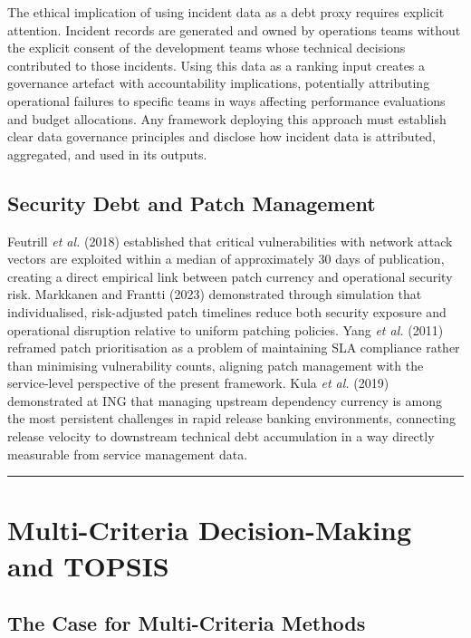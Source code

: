 \documentclass[
  british,
  12pt,
  a4paper,
]{report}
\begin{document}
The ethical implication of using incident data as a debt proxy requires
explicit attention. Incident records are generated and owned by
operations teams without the explicit consent of the development teams
whose technical decisions contributed to those incidents. Using this
data as a ranking input creates a governance artefact with
accountability implications, potentially attributing operational
failures to specific teams in ways affecting performance evaluations and
budget allocations. Any framework deploying this approach must establish
clear data governance principles and disclose how incident data is
attributed, aggregated, and used in its outputs.

\subsection{Security Debt and Patch
Management}\label{security-debt-and-patch-management}

Feutrill \emph{et al.} (2018) established that critical vulnerabilities
with network attack vectors are exploited within a median of
approximately 30 days of publication, creating a direct empirical link
between patch currency and operational security risk. Markkanen and
Frantti (2023) demonstrated through simulation that individualised,
risk-adjusted patch timelines reduce both security exposure and
operational disruption relative to uniform patching policies. Yang
\emph{et al.} (2011) reframed patch prioritisation as a problem of
maintaining SLA compliance rather than minimising vulnerability counts,
aligning patch management with the service-level perspective of the
present framework. Kula \emph{et al.} (2019) demonstrated at ING that
managing upstream dependency currency is among the most persistent
challenges in rapid release banking environments, connecting release
velocity to downstream technical debt accumulation in a way directly
measurable from service management data.

\begin{center}\rule{0.5\linewidth}{0.5pt}\end{center}

\section{Multi-Criteria Decision-Making and
TOPSIS}\label{multi-criteria-decision-making-and-topsis}

\subsection{The Case for Multi-Criteria
Methods}\label{the-case-for-multi-criteria-methods}
\end{document}
